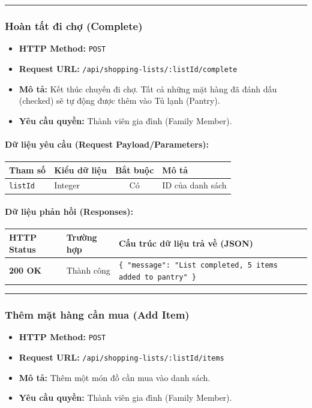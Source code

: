 \documentclass[12pt,a4paper]{article}
\begin{document}
\vskip 0.4cm
\noindent\rule{\textwidth}{0.3pt}
\vskip 0.4cm

\subsubsection{Hoàn tất đi chợ (Complete)}
\begin{itemize}[leftmargin=*]
    \item \textbf{HTTP Method:} \texttt{POST}
    \item \textbf{Request URL:} \texttt{/api/shopping-lists/:listId/complete}
    \item \textbf{Mô tả:} Kết thúc chuyến đi chợ. Tất cả những mặt hàng đã đánh dấu (checked) sẽ tự động được thêm vào Tủ lạnh (Pantry).
    \item \textbf{Yêu cầu quyền:} Thành viên gia đình (Family Member).
\end{itemize}

\paragraph{Dữ liệu yêu cầu (Request Payload/Parameters):}
\begin{longtable}{|p{2.8cm}|p{2.2cm}|c|p{7.0cm}|}
\hline
\textbf{Tham số} & \textbf{Kiểu dữ liệu} & \textbf{Bắt buộc} & \textbf{Mô tả} \\ \hline
\endhead
\texttt{listId} & Integer & Có & ID của danh sách \\ \hline
\end{longtable}

\paragraph{Dữ liệu phản hồi (Responses):}
\begin{longtable}{|p{2.8cm}|p{3.2cm}|p{8.0cm}|}
\hline
\textbf{HTTP Status} & \textbf{Trường hợp} & \textbf{Cấu trúc dữ liệu trả về (JSON)} \\ \hline
\endhead
\textbf{200 OK} & Thành công & \texttt{\{ "message": "List completed, 5 items added to pantry" \}} \\ \hline
\end{longtable}

\vskip 0.4cm
\noindent\rule{\textwidth}{0.3pt}
\vskip 0.4cm

\subsubsection{Thêm mặt hàng cần mua (Add Item)}
\begin{itemize}[leftmargin=*]
    \item \textbf{HTTP Method:} \texttt{POST}
    \item \textbf{Request URL:} \texttt{/api/shopping-lists/:listId/items}
    \item \textbf{Mô tả:} Thêm một món đồ cần mua vào danh sách.
    \item \textbf{Yêu cầu quyền:} Thành viên gia đình (Family Member).
\end{itemize}
\end{document}
